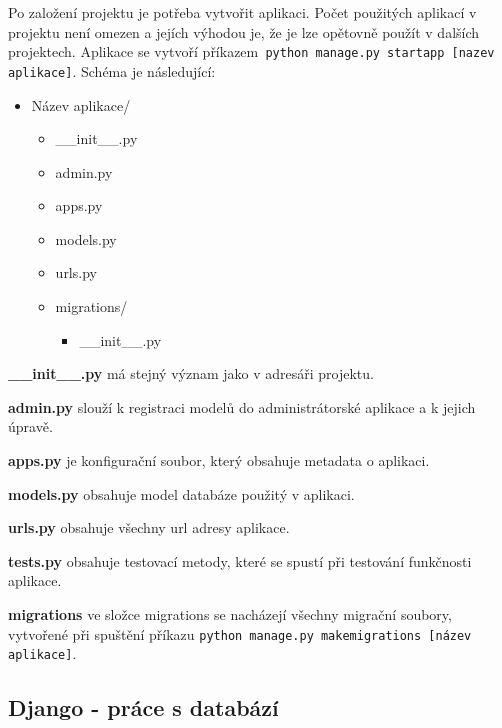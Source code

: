 Po založení projektu je potřeba vytvořit aplikaci. Počet použitých
aplikací v projektu není omezen a jejích výhodou je, že je lze
opětovně použít v dalších projektech. Aplikace se vytvoří příkazem{\tt
python manage.py startapp [nazev aplikace]}. \cite{django-init} Schéma je následující:

\begin{itemize}
	\item \lbrack Název aplikace\rbrack /
 	\begin{itemize}
 		\item \_\_init\_\_.py
		\item admin.py
		\item apps.py
		\item models.py
		\item urls.py
		\item \lbrack migrations\rbrack /
		\begin{itemize}
			\item \_\_init\_\_.py
		\end{itemize}
	\end{itemize}
\end{itemize}

\vspace{9px}

\textbf{\_\_init\_\_.py} má stejný význam jako v adresáři projektu. 
\vspace{6px}

\textbf{admin.py} slouží k registraci modelů do administrátorské
aplikace a k jejich úpravě.  \vspace{6px}

\textbf{apps.py} je konfigurační soubor, který obsahuje metadata o 
aplikaci.
\vspace{6px}

\textbf{models.py} obsahuje model databáze použitý v aplikaci.
\vspace{6px}

\textbf{urls.py} obsahuje všechny url adresy aplikace.
\vspace{6px}

\textbf{tests.py} obsahuje testovací metody, které se spustí při
testování funkčnosti aplikace.
\vspace{6px}

\textbf{migrations} ve složce migrations se nacházejí všechny migrační
soubory, vytvořené při spuštění příkazu {\tt python manage.py makemigrations [název aplikace]}.

\newpage

\subsection{Django - práce s databází}


